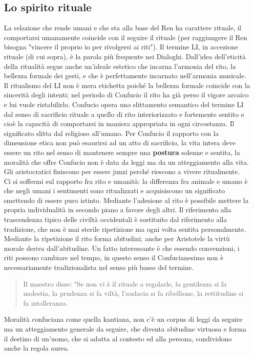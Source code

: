 \documentclass[10pt,a4paper]{report}
\begin{document}
\subsection{Lo spirito rituale}
La relazione che rende umani e che sta alla base del Ren ha carattere rituale, il comportarsi umanamente coincide con il seguire il rituale (per raggiungere il Ren bisogna "vincere il proprio io per rivolgersi ai riti"). Il termine LI, in accezione rituale (di cui sopra), è la parola più frequente nei Dialoghi. Dall'idea dell'eticità della ritualità segue anche un'ideale estetico che incarna l'armonia del rito, la bellezza formale dei gesti, e che è perfettamente incarnato nell'armonia musicale. Il ritualismo del LI non è mera etichetta poiché la bellezza formale coincide con la sincerità degli intenti; nel periodo di Confucio il rito ha già perso il vigore arcaico e lui vuole ristabilirlo. Confucio opera uno slittamento semantico del termine LI dal senso di sacrificio rituale a quello di rito interiorizzato e fortemente sentito e cioè la capacità di comportarsi in maniera appropriata in ogni circostanza. Il significato slitta dal religioso all'umano. Per Confucio il rapporto con la dimensione etica non può esaurirsi ad un atto di sacrificio, la vita intera deve essere un rito nel senso di mantenere sempre una \textbf{postura} solenne e sentita, la moralità che offre Confucio non è data da leggi ma da un atteggiamento alla vita. Gli aristocratici finiscono per essere junzi perché riescono a vivere ritualmente.\\
Ci si soffermi sul rapporto fra rito e umanità: la differenza fra animale e umano è che negli umani i sentimenti sono ritualizzati e acquisiscono un significato smettendo di essere puro istinto. Mediante l'adesione al rito è possibile mettere la propria individualità in secondo piano a favore degli altri. Il riferimento alla trascendenza tipico delle civiltà occidentali è sostituito dal riferimento alla tradizione, che non è mai sterile ripetizione ma ogni volta sentita personalmente. Mediante la ripetizione il rito forma abitudini; anche per Aristotele la virtù morale deriva dall'abitudine. Un fatto interessante è che essendo convenzioni, i riti possono cambiare nel tempo, in questo senso il Confucianesimo non è necessariamente tradizionalista nel senso più basso del termine.
\begin{quote}
	 Il maestro disse: "Se non vi è il rituale a regolarle, la gentilezza si fa molestia, la prudenza si fa viltà, l'audacia si fa ribellione, la rettitudine si fa intolleranza.
\end{quote}
Moralità confuciana come quella kantiana, non c'è un corpus di leggi da seguire ma un atteggiamento generale da seguire, che diventa abitudine virtuosa e forma il destino di un'uomo, che si adatta al contesto ed alla persona, condividono anche la regola aurea.
\end{document}
